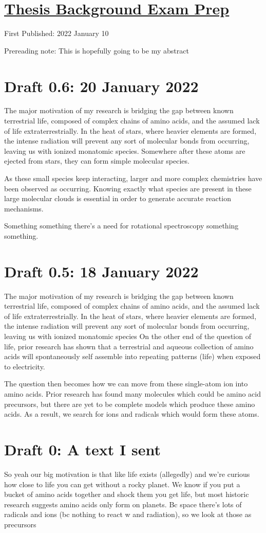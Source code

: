 \documentclass[12pt]{article}[titlepage]
\newcommand{\1}{\={a}}
\newcommand{\2}{\={e}}
\newcommand{\3}{\={\i}}
\newcommand{\4}{\=o}
\newcommand{\5}{\=u}
\newcommand{\6}{\={A}}
\renewcommand{\,}{\textsuperscript{,}}
\begin{document}
\doublespacing
\section{\href{thesis-background-prep-1.html}{Thesis Background Exam Prep}}
First Published: 2022 January 10

Prereading note: This is hopefully going to be my abstract
\section{Draft 0.6: 20 January 2022}
The major motivation of my research is bridging the gap between known terrestrial life, composed of complex chains of amino acids, and the assumed lack of life extraterrestrially.
In the heat of stars, where heavier elements are formed, the intense radiation will prevent any sort of molecular bonds from occurring, leaving us with ionized monatomic species.
Somewhere after these atoms are ejected from stars, they can form simple molecular species.

As these small species keep interacting, larger and more complex chemistries have been observed as occurring.
Knowing exactly what species are present in these large molecular clouds is essential in order to generate accurate reaction mechanisms.

Something something there's a need for rotational spectroscopy something something.

\section{Draft 0.5: 18 January 2022}
The major motivation of my research is bridging the gap between known terrestrial life, composed of complex chains of amino acids, and the assumed lack of life extraterrestrially.
In the heat of stars, where heavier elements are formed, the intense radiation will prevent any sort of molecular bonds from occurring, leaving us with ionized monatomic species
On the other end of the question of life, prior research has shown that a terrestrial and aqueous collection of amino acids will spontaneously self assemble into repeating patterns (life) when exposed to electricity. 

The question then becomes how we can move from these single-atom ion into amino acids.
Prior research has found many molecules which could be amino acid precursors, but there are yet to be complete models which produce these amino acids.
As a result, we search for ions and radicals which would form these atoms.

\section{Draft 0: A text I sent}
So yeah our big motivation is that like life exists (allegedly) and we're curious how close to life you can get without a rocky planet. We know if you put a bucket of amino acids together and shock them you get life, but most historic research suggests amino acids only form on planets. Bc space there's lots of radicals and ions (bc nothing to react w and radiation), so we look at those as precursors
\end{document}
